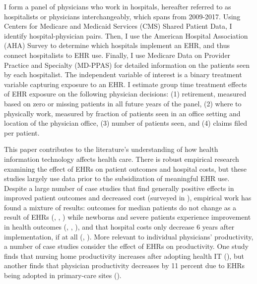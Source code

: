 \documentclass[12pt]{article}
\begin{document}
I form a panel of physicians who work in hospitals, hereafter referred to as hospitalists or physicians interchangeably, which spans from 2009-2017. Using Centers for Medicare and Medicaid Services (CMS) Shared Patient Data, I identify hospital-physician pairs. Then, I use the American Hospital Association (AHA) Survey to determine which hospitals implement an EHR, and thus connect hospitalists to EHR use. Finally, I use Medicare Data on Provider Practice and Specialty (MD-PPAS) for detailed information on the patients seen by each hospitalist. The independent variable of interest is a binary treatment variable capturing exposure to an EHR. I estimate group time treatment effects of EHR exposure on the following physician decisions: (1) retirement, measured based on zero or missing patients in all future years of the panel, (2) where to physically work, measured by fraction of patients seen in an office setting and location of the physician office, (3) number of patients seen, and (4) claims filed per patient. 

This paper contributes to the literature's understanding of how health information technology affects health care. There is robust empirical research examining the effect of EHRs on patient outcomes and hospital costs, but these studies largely use data prior to the subsidization of meaningful EHR use. Despite a large number of case studies that find generally positive effects in improved patient outcomes and decreased cost (surveyed in \cite{Buntin2011TheResults}), empirical work has found a mixture of results: outcomes for median patients do not change as a result of EHRs (\cite{Agha2014TheCare}, \cite{McCullough2016HealthCoordination}, \cite{Meyerhoefer}) while newborns and severe patients experience improvement in health outcomes (\cite{Miller2009}, \cite{Freedman2015}, \cite{McCullough2016HealthCoordination}), and that hospital costs only decrease 6 years after implementation, if at all (\cite{Agha2014TheCare}, \cite{dranove2014trillion}). More relevant to individual physicians' productivity, a number of case studies consider the effect of EHRs on productivity. One study finds that nursing home productivity increases after adopting health IT (\cite{Hitt2016}), but another finds that physician productivity decreases by 11 percent due to EHRs being adopted in primary-care sites (\cite{Meyerhoefer}).  
\end{document}
